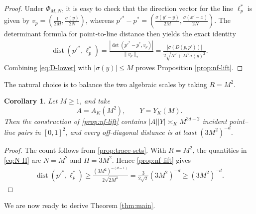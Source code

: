 \documentclass[11pt,reqno]{amsart}
\newtheorem{corollary}[corollary]{Corollary}
\theoremstyle{definition}
\theoremstyle{remark}
\newcommand{\dist}{\operatorname{dist}}
\begin{document}
\begin{proof}
Under $\Phi_{M,N}$, it is easy to check that the direction vector for the line $\ell_p^*$ is given by $v_p=\left(\frac1{2M},\frac{\sigma(y)}{2N}\right)$,
whereas $p'^*-p^* =\left( \frac{\sigma(y'-y)}{2M}, \frac{\sigma(x'-x)}{2N}\right)$. The determinant formula for point-to-line distance then yields the exact identity
\begin{equation}
\label{eq:nf-distance-exact}
\begin{aligned}
        \dist(p'^*,\ell_p^*)=\frac{|\det(p'^*-p^*,v_p)|}{\|v_p\|_2}=\frac{|\sigma(D(p,p'))|}
                {2\sqrt{N^2+M^2\sigma(y)^2}}.
\end{aligned}
\end{equation}
Combining \eqref{eq:D-lower} with $|\sigma(y)|\le M$ proves Proposition \ref{prop:nf-lift}.
\end{proof}

The natural choice is to balance the two algebraic scales by taking
$R=M^2$.

\begin{corollary}
\label{cor:balanced-construction}
Let $M\ge1$, and take
\[
        A=A_K(M^2),
        \qquad
        Y=Y_K(M).
\]
Then the construction of \cref{prop:nf-lift} contains  $|A||Y|\asymp_K M^{3d-2}$ incident point--line pairs in $[0,1]^2$, and every off-diagonal distance
is at least $(3M^2)^{-d}$. 
\end{corollary}

\begin{proof}
The count follows from \cref{prop:trace-sets}.  With $R=M^2$, the
quantities in \eqref{eq:N-H} are $N=M^2$ and $H=3M^2$.  Hence
\cref{prop:nf-lift} gives
\[
\begin{aligned}
        \dist(p'^*,\ell_p^*) \ge
        \frac{(3M^2)^{-(d-1)}}{2\sqrt{2M^4}}=\frac{3}{2\sqrt2}(3M^2)^{-d}\ge(3M^2)^{-d}.
\end{aligned}
\]
\end{proof}

We are now ready to derive Theorem \ref{thm:main}.
\end{document}
